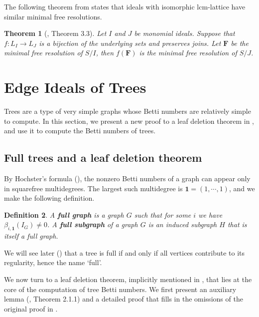 \documentclass[dvipsnames,10pt]{article}
\newtheorem{theorem}{Theorem}[section]
\newtheorem{defi}[theorem]{Definition}
\begin{document}
The following theorem from \cite{welker1999lcm} states that ideals with isomorphic lcm-lattice have similar minimal free resolutions.

\begin{theorem}[\cite{welker1999lcm}, Theorem 3.3]
    Let $I$ and $J$ be monomial ideals. Suppose that $f:L_I\to L_J$ is a bijection of the underlying sets and preserves joins. Let $\mathbf{F}$ be the minimal free resolution of $S/I$, then $f(\mathbf{F})$ is the minimal free resolution of $S/J$.
\end{theorem}


\section{Edge Ideals of Trees}

Trees are a type of very simple graphs whose Betti numbers are relatively simple to compute. In this section, we present a new proof to a leaf deletion theorem in \cite{bouchat}, and use it to compute the Betti numbers of trees.

\subsection{Full trees and a leaf deletion theorem}

By Hochster's formula (), the nonzero Betti numbers of a graph can appear only in squarefree multidegrees. The largest such multidegree is $\mathbf{1}=(1,\cdots,1)$, and we make the following definition.
\begin{defi}
    A \textbf{full graph} is a graph $G$ such that for some $i$ we have $\beta_{i,\mathbf{1}}(I_G)\neq 0$. A \textbf{full subgraph} of a graph $G$ is an induced subgraph $H$ that is itself a full graph.
\end{defi}
We will see later () that a tree is full if and only if all vertices contribute to its regularity, hence the name `full'.

We now turn to a leaf deletion theorem, implicitly mentioned in \cite{bouchat}, that lies at the core of the computation of tree Betti numbers. We first present an auxiliary lemma (\cite{bouchat}, Theorem 2.1.1) and a detailed proof that fills in the omissions of the original proof in \cite{bouchat}.
\end{document}

